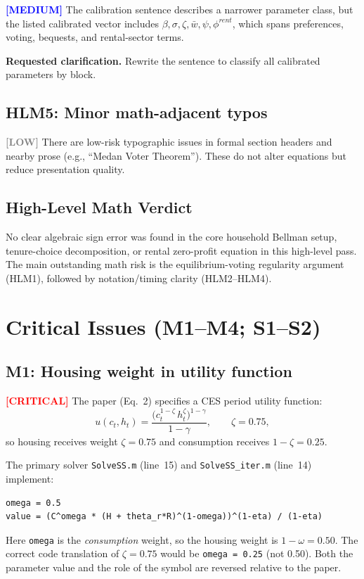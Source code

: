 \documentclass[11pt]{article}
\newcommand{\critical}{\textcolor{red}{\textbf{[CRITICAL]}}}
\newcommand{\medium}{\textcolor{blue}{\textbf{[MEDIUM]}}}
\newcommand{\low}{\textcolor{gray}{\textbf{[LOW]}}}
\begin{document}
\medium{} The calibration sentence describes a narrower parameter class, but the listed
calibrated vector includes \(\beta, \sigma, \zeta, \bar{w}, \psi, \phi^{rent}\),
which spans preferences, voting, bequests, and rental-sector terms.

\noindent\textbf{Requested clarification.} Rewrite the sentence to classify all calibrated
parameters by block.

\subsection*{HLM5: Minor math-adjacent typos}

\low{} There are low-risk typographic issues in formal section headers and nearby prose
(e.g., ``Medan Voter Theorem''). These do not alter equations but reduce presentation quality.

\subsection*{High-Level Math Verdict}

No clear algebraic sign error was found in the core household Bellman setup, tenure-choice
decomposition, or rental zero-profit equation in this high-level pass. The main outstanding
math risk is the equilibrium-voting regularity argument (HLM1), followed by notation/timing
clarity (HLM2--HLM4).

\section*{Critical Issues (M1--M4; S1--S2)}

\subsection*{M1: Housing weight in utility function}

\critical{} The paper (Eq.~2) specifies a CES period utility function:
\[
  u(c_t, h_t) = \frac{\bigl(c_t^{1-\zeta}\,h_t^{\zeta}\bigr)^{1-\gamma}}{1-\gamma},
  \qquad \zeta = 0.75,
\]
so housing receives weight $\zeta = 0.75$ and consumption receives $1-\zeta = 0.25$.

The primary solver \texttt{SolveSS.m} (line~15) and \texttt{SolveSS\_iter.m} (line~14) implement:
\begin{verbatim}
omega = 0.5
value = (C^omega * (H + theta_r*R)^(1-omega))^(1-eta) / (1-eta)
\end{verbatim}
Here \texttt{omega} is the \emph{consumption} weight, so the housing weight is $1-\omega = 0.50$. The correct code translation of $\zeta = 0.75$ would be \texttt{omega = 0.25} (not 0.50). Both the parameter value and the role of the symbol are reversed relative to the paper.
\end{document}
